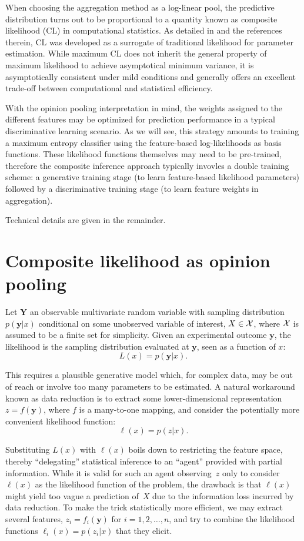 \documentclass[english]{scrartcl}
\def\y{{\mathbf{y}}}
\begin{document}
When choosing the aggregation method as a log-linear pool, the predictive distribution turns out to be proportional to a quantity known as composite likelihood (CL) in computational statistics. As detailed in \cite{Varin-11} and the references therein, CL was developed as a surrogate of traditional likelihood for parameter estimation. While maximum CL does not inherit the general property of maximum likelihood to achieve asymptotical minimum variance, it is asymptotically consistent under mild conditions \cite{Xu-11} and generally offers an excellent trade-off between computational and statistical efficiency.

With the opinion pooling interpretation in mind, the weights assigned to the different features may be optimized for prediction performance in a typical discriminative learning scenario. As we will see, this strategy amounts to training a maximum entropy classifier using the feature-based log-likelihoods as basis functions. These likelihood functions themselves may need to be pre-trained, therefore the composite inference approach typically invovles a double training scheme: a generative training stage (to learn feature-based likelihood parameters) followed by a discriminative training stage (to learn feature weights in aggregation).

Technical details are given in the remainder.



\section{Composite likelihood as opinion pooling}
\label{sec:log_pool}

Let $\mathbf{Y}$ an observable multivariate random variable with sampling distribution $p(\y|x)$ conditional on some unobserved variable of interest, $X\in{\cal X}$, where ${\cal X}$ is assumed to be a finite set for simplicity. Given an experimental outcome $\y$, the likelihood is the sampling distribution evaluated at $\y$, seen as a function of $x$:
$$
L(x) = p(\y|x)
.
$$

This requires a plausible generative model which, for complex data, may be out of reach or involve too many parameters to be estimated. A natural workaround known as data reduction is to extract some lower-dimensional representation $z=f(\y)$, where $f$ is a many-to-one mapping, and consider the potentially more convenient likelihood function:
$$
\ell(x) = p(z|x)
.
$$

Substituting $L(x)$ with $\ell(x)$ boils down to restricting the feature space, thereby  ``delegating'' statistical inference to an ``agent'' provided with partial information. While it is valid for such an agent observing~$z$ only to consider $\ell(x)$ as the likelihood function of the problem, the drawback is that $\ell(x)$ might yield too vague a prediction of~$X$ due to the information loss incurred by data reduction. To make the trick statistically more efficient, we may extract several features, $z_i=f_i(\y)$ for $i=1,2,\ldots,n$, and try to combine the likelihood functions $\ell_i(x) = p(z_i|x)$ that they elicit.
\end{document}
